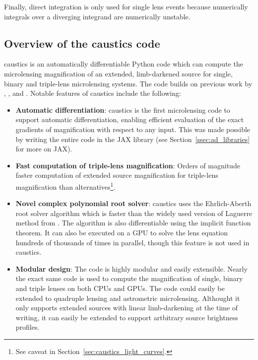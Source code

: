 \documentclass[12pt,dvipsnames]{report}
\newcommand{\ssf}[1]{\textsf{#1}}
\begin{document}
Finally, direct integration is only used for single lens events because 
        numerically integrals over a diverging integrand are numerically unstable.


\subsection{Overview of the \ssf{caustics} code}
\ssf{caustics} is an 
automatically differentiable \ssf{Python} code which can compute the microlensing 
magnification of an extended, limb-darkened source for single, binary and triple-lens
microlensing systems. The code builds on previous work by
\citet{2021MNRAS.503.6143K}, \citet{1998A&A...333L..79D},
\citet{2007MNRAS.377.1679D} and \citet{2018MNRAS.479.5157B}.
Notable features of \ssf{caustics} include the following:
\begin{itemize}
    \item \textbf{Automatic differentiation}: \ssf{caustics} is the first microlensing 
         code to support automatic differentiation, enabling efficient evaluation of the 
         exact gradients of magnification with respect to any input. 
            This was made possible by writing the
          entire code in the \ssf{JAX} library (see Section~\ref{ssec:ad_libraries} for more 
          on \ssf{JAX}).
    \item \textbf{Fast computation of triple-lens magnification}: Orders of magnitude faster 
            computation of extended source magnification for triple-lens magnification 
            than alternatives\footnote{See caveat in 
        Section~\ref{sec:caustics_light_curves}.}.
    \item  \textbf{Novel complex polynomial root solver}: 
            \ssf{caustics} uses the 
          Ehrlich-Aberth root solver algorithm which is faster than the widely used version of
          Laguerre method from \citet{2012arXiv1203.1034S}. The algorithm is also
          differentiable using the implicit function theorem. 
          It can also be executed on a GPU to solve the lens
          equation hundreds of thousands of times in parallel, though this feature is not 
          used in \ssf{caustics}.
    \item  \textbf{Modular design}: The code is highly modular and easily extensible. 
            Nearly the exact same code is
          used to compute the magnification of single, binary and triple lenses on both
          CPUs and GPUs. The code could easily be extended to quadruple lensing
          and astrometric  microlensing. Althought it only supports extended sources with 
          linear limb-darkening at the time of writing, it can easily be extended to 
          support artbitrary source brightness profiles.
\end{itemize}
\end{document}
